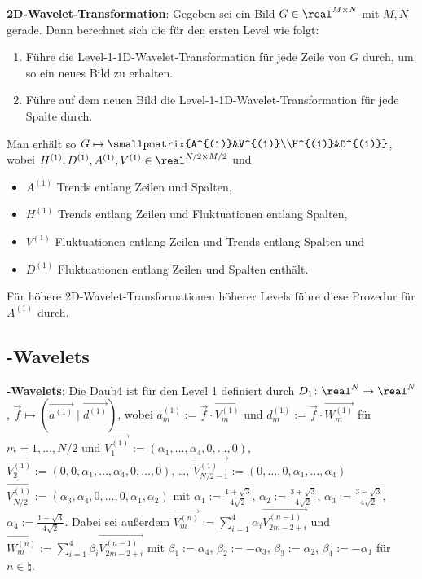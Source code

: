 \textbf{2D-Wavelet-Transformation}:
Gegeben sei ein Bild $G \in \real^{M \times N}$ mit $M, N$ gerade.
Dann berechnet sich die  für den ersten Level wie folgt:
\begin{enumerate}
    \item
    Führe die Level-1-1D-Wavelet-Transformation für jede Zeile von $G$ durch,
    um so ein neues Bild zu erhalten.
    
    \item
    Führe auf dem neuen Bild die Level-1-1D-Wavelet-Transformation für jede Spalte durch.
\end{enumerate}
Man erhält so $G \mapsto \smallpmatrix{A^{(1)}&V^{(1)}\\H^{(1)}&D^{(1)}}$,
wobei $H^{(1)}, D^{(1)}, A^{(1)}, V^{(1)} \in \real^{N/2 \times M/2}$ und
\begin{itemize}
    \item
    $A^{(1)}$ Trends entlang Zeilen und Spalten,
    
    \item
    $H^{(1)}$ Trends entlang Zeilen und Fluktuationen entlang Spalten,
    
    \item
    $V^{(1)}$ Fluktuationen entlang Zeilen und Trends entlang Spalten und
    
    \item
    $D^{(1)}$ Fluktuationen entlang Zeilen und Spalten enthält.
\end{itemize}
Für höhere 2D-Wavelet-Transformationen höherer Levels führe diese Prozedur für $A^{(1)}$ durch.

\subsection{%
    -Wavelets%
}

\textbf{-Wavelets}:
Die  Daub4 ist für den Level 1 definiert durch
$D_1\colon \real^N \to \real^N$, $\vec{f} \mapsto (\vec{a^{(1)}} \;|\; \vec{d^{(1)}})$,
wobei $a_m^{(1)} := \vec{f} \cdot \vec{V_m^{(1)}}$ und $d_m^{(1)} := \vec{f} \cdot \vec{W_m^{(1)}}$
für $m = 1, \dotsc, N/2$ und
$\vec{V_1^{(1)}} := (\alpha_1, \dotsc, \alpha_4, 0, \dotsc, 0)$,
$\vec{V_2^{(1)}} := (0, 0, \alpha_1, \dotsc, \alpha_4, 0, \dotsc, 0)$,
\dots,
$\vec{V_{N/2-1}^{(1)}} := (0, \dotsc, 0, \alpha_1, \dotsc, \alpha_4)$
$\vec{V_{N/2}^{(1)}} := (\alpha_3, \alpha_4, 0, \dotsc, 0, \alpha_1, \alpha_2)$
mit
$\alpha_1 := \frac{1 + \sqrt{3}}{4\sqrt{2}}$,
$\alpha_2 := \frac{3 + \sqrt{3}}{4\sqrt{2}}$,
$\alpha_3 := \frac{3 - \sqrt{3}}{4\sqrt{2}}$,
$\alpha_4 := \frac{1 - \sqrt{3}}{4\sqrt{2}}$.
Dabei sei außerdem
$\vec{V_m^{(n)}} := \sum_{i=1}^{4} \alpha_i \vec{V_{2m-2+i}^{(n-1)}}$ und\\
$\vec{W_m^{(n)}} := \sum_{i=1}^{4} \beta_i \vec{V_{2m-2+i}^{(n-1)}}$
mit
$\beta_1 := \alpha_4$,
$\beta_2 := -\alpha_3$,
$\beta_3 := \alpha_2$,
$\beta_4 := -\alpha_1$
für $n \in \natural$.


